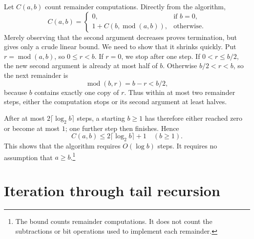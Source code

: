Let $C(a,b)$ count remainder computations. Directly from the algorithm,
\[
C(a,b)=\begin{cases}
0,&\text{if }b=0,\\
1+C(b,\operatorname{mod}(a,b)),&\text{otherwise}.
\end{cases}
\]
Merely observing that the second argument decreases proves termination,
but gives only a crude linear bound. We need to show that it shrinks quickly.
Put $r=\operatorname{mod}(a,b)$, so $0\leq r<b$. If $r=0$, we stop after
one step. If $0<r\leq b/2$, the new second argument is already at most half
of $b$. Otherwise $b/2<r<b$, so the next remainder is
\[
\operatorname{mod}(b,r)=b-r<b/2,
\]
because $b$ contains exactly one copy of $r$. Thus within at most two
remainder steps, either the computation stops or its second argument at
least halves.

After at most $2\lceil\log_2 b\rceil$ steps, a starting $b\geq1$ has
therefore either reached zero or become at most $1$; one further step then
finishes. Hence
\[
C(a,b)\leq2\lceil\log_2 b\rceil+1\quad(b\geq1).
\]
This shows that the algorithm requires $O(\log b)$  steps. It requires no assumption that $a\geq b$.\footnote{The
bound counts remainder computations. It does not count the subtractions
or bit operations used to implement each remainder.}

\section{Iteration through tail recursion}
\label{sec:alg-iteration}

